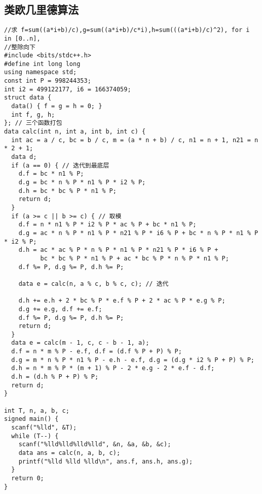 \documentclass[twoside]{article}
\begin{document}
\subsection{类欧几里德算法}
\begin{lstlisting}
//求 f=sum((a*i+b)/c),g=sum((a*i+b)/c*i),h=sum(((a*i+b)/c)^2), for i in [0..n],
//整除向下
#include <bits/stdc++.h>
#define int long long
using namespace std;
const int P = 998244353;
int i2 = 499122177, i6 = 166374059;
struct data {
  data() { f = g = h = 0; }
  int f, g, h;
}; // 三个函数打包
data calc(int n, int a, int b, int c) {
  int ac = a / c, bc = b / c, m = (a * n + b) / c, n1 = n + 1, n21 = n * 2 + 1;
  data d;
  if (a == 0) { // 迭代到最底层
    d.f = bc * n1 % P;
    d.g = bc * n % P * n1 % P * i2 % P;
    d.h = bc * bc % P * n1 % P;
    return d;
  }
  if (a >= c || b >= c) { // 取模
    d.f = n * n1 % P * i2 % P * ac % P + bc * n1 % P;
    d.g = ac * n % P * n1 % P * n21 % P * i6 % P + bc * n % P * n1 % P * i2 % P;
    d.h = ac * ac % P * n % P * n1 % P * n21 % P * i6 % P +
          bc * bc % P * n1 % P + ac * bc % P * n % P * n1 % P;
    d.f %= P, d.g %= P, d.h %= P;

    data e = calc(n, a % c, b % c, c); // 迭代

    d.h += e.h + 2 * bc % P * e.f % P + 2 * ac % P * e.g % P;
    d.g += e.g, d.f += e.f;
    d.f %= P, d.g %= P, d.h %= P;
    return d;
  }
  data e = calc(m - 1, c, c - b - 1, a);
  d.f = n * m % P - e.f, d.f = (d.f % P + P) % P;
  d.g = m * n % P * n1 % P - e.h - e.f, d.g = (d.g * i2 % P + P) % P;
  d.h = n * m % P * (m + 1) % P - 2 * e.g - 2 * e.f - d.f;
  d.h = (d.h % P + P) % P;
  return d;
}

int T, n, a, b, c;
signed main() {
  scanf("%lld", &T);
  while (T--) {
    scanf("%lld%lld%lld%lld", &n, &a, &b, &c);
    data ans = calc(n, a, b, c);
    printf("%lld %lld %lld\n", ans.f, ans.h, ans.g);
  }
  return 0;
}

\end{lstlisting}
\end{document}
